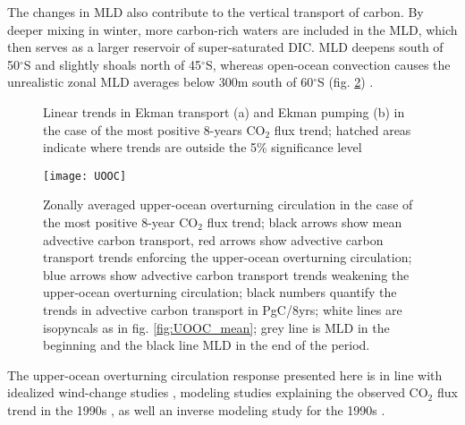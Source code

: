 The changes in \ac{MLD} also contribute to the vertical transport of carbon. By deeper mixing in winter, more carbon-rich waters are included in the \acs{MLD}, which then serves as a larger reservoir of super-saturated \acs{DIC}. \acs{MLD} deepens south of 50$^\circ$S and slightly shoals north of 45$^\circ$S, whereas open-ocean convection causes the unrealistic zonal \acs{MLD} averages below 300m south of 60$^\circ$S (fig. \ref{fig:UOOC_pos}) \citep{Sallee2013,Stoessel2015}. 


\begin{figure}[h!]
	\centering
	\vspace{-5mm}
	\caption{Linear trends in Ekman transport (a) and Ekman pumping (b) in the case of the most positive 8-years CO$_2$ flux trend; hatched areas indicate where trends are outside the 5\% significance level}
	\label{fig:ekman_pos}
\end{figure}


\begin{figure}[h!]
	\centering
	\texttt{[image: UOOC]}
	\vspace{-5mm}
	\caption{Zonally averaged upper-ocean overturning circulation in the case of the most positive 8-year CO$_2$ flux trend; black arrows show mean advective carbon transport, red arrows show advective carbon transport trends enforcing the upper-ocean overturning circulation; blue arrows show advective carbon transport trends weakening the upper-ocean overturning circulation; black numbers quantify the trends in advective carbon transport in PgC/8yrs; white lines are isopyncals as in fig. \ref{fig:UOOC_mean}; grey line is \ac{MLD} in the beginning and the black line MLD in the end of the period.}
	\label{fig:UOOC_pos}
\end{figure}

The upper-ocean overturning circulation response presented here is in line with idealized wind-change studies \citep{Lauderdale2013}, modeling studies explaining the observed CO$_2$ flux trend in the 1990s \citep{LeQuere2007,Lovenduski2007,Lovenduski2008}, as well an inverse modeling study for the 1990s \citep{DeVries2017}.


\clearpage

